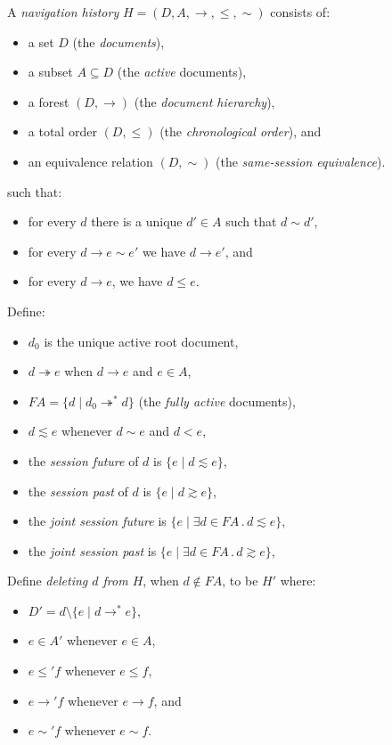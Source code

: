 \documentclass{article}
\newcommand{\aNH}{H}
\newcommand{\Docs}{D}
\newcommand{\Active}{A}
\newcommand{\FullyActive}{F\!A}
\newcommand{\parentOf}{\rightarrow}
\newcommand{\parentOfActive}{\twoheadrightarrow}
\newcommand{\leChron}{\le}
\newcommand{\ltChron}{<}
\newcommand{\eqSess}{\sim}
\newcommand{\ltSess}{\lesssim}
\newcommand{\gtSess}{\gtrsim}
\newcommand{\rootDoc}{d_0}
\newcommand{\aDoc}{d}
\newcommand{\bDoc}{e}
\newcommand{\cDoc}{f}
\newcommand{\st}{\mathbin.}
\begin{document}
A \emph{navigation history} $\aNH=(\Docs,\Active,{\parentOf},{\leChron},{\eqSess})$ consists of:
\begin{itemize}
\item a set $\Docs$ (the \emph{documents}),
\item a subset $\Active \subseteq \Docs$ (the \emph{active} documents),
\item a forest $(\Docs,{\parentOf})$ (the \emph{document hierarchy}),
\item a total order $(\Docs,{\leChron})$ (the \emph{chronological order}), and
\item an equivalence relation $(\Docs,{\eqSess})$ (the \emph{same-session equivalence}).
\end{itemize}
such that:
\begin{itemize}
\item for every $\aDoc$ there is a unique $\aDoc'\in\Active$ such that $\aDoc \eqSess \aDoc'$,
\item for every $\aDoc \parentOf \bDoc \eqSess \bDoc'$
  we have $\aDoc \parentOf \bDoc'$, and
\item for every $\aDoc \parentOf \bDoc$, we have $\aDoc \leChron \bDoc$.
\end{itemize}
Define:
\begin{itemize}
\item $\rootDoc$ is the unique active root document,
\item $\aDoc \parentOfActive \bDoc$ when $\aDoc \parentOf \bDoc$ and $\bDoc \in \Active$,
\item $\FullyActive = \{ \aDoc \mid \rootDoc \parentOfActive^* \aDoc \}$
  (the \emph{fully active} documents),
\item $\aDoc \ltSess \bDoc$ whenever $\aDoc \eqSess \bDoc$ and $\aDoc \ltChron \bDoc$,
\item the \emph{session future} of $\aDoc$ is $\{ \bDoc \mid \aDoc \ltSess \bDoc \}$,
\item the \emph{session past} of $\aDoc$ is $\{ \bDoc \mid \aDoc \gtSess \bDoc \}$,
\item the \emph{joint session future} is $\{ \bDoc \mid \exists \aDoc \in \FullyActive \st \aDoc \ltSess \bDoc \}$,
\item the \emph{joint session past} is $\{ \bDoc \mid \exists \aDoc \in \FullyActive \st \aDoc \gtSess \bDoc \}$,
\end{itemize}
Define \emph{deleting $\aDoc$ from $\aNH$}, when $\aDoc\not\in\FullyActive$, to be $\aNH'$ where:
\begin{itemize}
\item $\Docs' = \aDoc \setminus \{ \bDoc \mid \aDoc\parentOf^* \bDoc \}$,
\item $\bDoc\in\Active'$ whenever $\bDoc\in\Active$,
\item $\bDoc\leChron'\cDoc$ whenever $\bDoc\leChron\cDoc$,
\item $\bDoc\parentOf'\cDoc$ whenever $\bDoc\parentOf\cDoc$, and
\item $\bDoc\eqSess'\cDoc$ whenever $\bDoc\eqSess\cDoc$.
\end{itemize}
\end{document}
